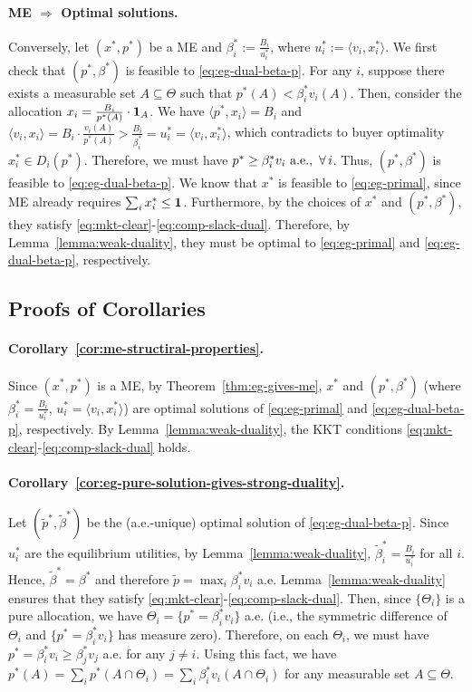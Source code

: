 	\paragraph{ME $\Rightarrow$ Optimal solutions.}
	Conversely, let $(x^*, p^*)$ be a ME and $\beta^*_i := \frac{B_i}{u^*_i}$, where $u^*_i := \langle v_i, x^*_i \rangle$. We first check that $(p^*, \beta^*)$ is feasible to \eqref{eq:eg-dual-beta-p}. For any $i$, suppose there exists a measurable set $A\subseteq \Theta$ such that $p^*(A) < \beta^*_i v_i(A)$. Then, consider the allocation $x_i = \frac{B_i}{p^*(A)} \cdot \mathbf{1}_A$. 
	We have 
	$\langle p^*, x_i \rangle = B_i$
	and 
	$\langle v_i, x_i\rangle = B_i \cdot \frac{v_i(A)}{p^*(A)} > \frac{B_i}{\beta^*_i} = u^*_i = \langle v_i, x^*_i \rangle$,
	which contradicts to buyer optimality $x^*_i \in D_i(p^*)$. 
	Therefore, we must have
	 $p^* \geq \beta^*_i v_i \ \textnormal{a.e.},\ \forall\, i$.
	Thus, $(p^*, \beta^*)$ is feasible to \eqref{eq:eg-dual-beta-p}.
	We know that $x^*$ is feasible to \eqref{eq:eg-primal}, since ME already requires $\sum_i x^*_i \leq \mathbf{1}$.
	Furthermore, by the choices of $x^*$ and $(p^*, \beta^*)$, they satisfy \eqref{eq:mkt-clear}-\eqref{eq:comp-slack-dual}.
	Therefore, by Lemma~\ref{lemma:weak-duality}, they must be optimal to \eqref{eq:eg-primal} and \eqref{eq:eg-dual-beta-p}, respectively. 

	\subsection*{Proofs of Corollaries}
	\paragraph{Corollary~\ref{cor:me-structiral-properties}.} 
	Since $(x^*, p^*)$ is a ME, by Theorem~\ref{thm:eg-gives-me}, $x^*$ and $(p^*, \beta^*)$ (where $\beta^*_i = \frac{B_i}{u^*_i}$, $u^*_i = \langle v_i, x^*_i\rangle$) are optimal solutions of \eqref{eq:eg-primal} and \eqref{eq:eg-dual-beta-p}, respectively. By Lemma~\ref{lemma:weak-duality}, the KKT conditions \eqref{eq:mkt-clear}-\eqref{eq:comp-slack-dual} holds. 

	\paragraph{Corollary~\ref{cor:eg-pure-solution-gives-strong-duality}.}
	Let $(\tilde{p}^*, \tilde{\beta}^*)$ be the (a.e.-unique) optimal solution of \eqref{eq:eg-dual-beta-p}.
	Since $u^*_i$ are the equilibrium utilities, by Lemma~\ref{lemma:weak-duality}, $\tilde{\beta}^*_i = \frac{B_i}{u^*_i}$ for all $i$. Hence, $\tilde{\beta}^* = \beta^*$ and therefore $\tilde{p} = \max_i \beta^*_i v_i$ a.e. 
	Lemma~\ref{lemma:weak-duality} ensures that they satisfy \eqref{eq:mkt-clear}-\eqref{eq:comp-slack-dual}. 
	Then, since $\{\Theta_i\}$ is a pure allocation, we have $\Theta_i = \{ p^* = \beta^*_i v_i \}$ a.e. (i.e., the symmetric difference of $\Theta_i$ and $\{ p^* = \beta^*_i v_i \}$ has measure zero). 
	Therefore, on each $\Theta_i$, we must have $p^* = \beta^*_i v_i \geq \beta^*_j v_j$ a.e. for any $j\neq i$. 
	Using this fact, we have
	$ p^*(A) = \sum_i p^*(A\cap \Theta_i) = \sum_i \beta^*_i v_i(A\cap \Theta_i)$
	for any measurable set $A \subseteq \Theta$. 

